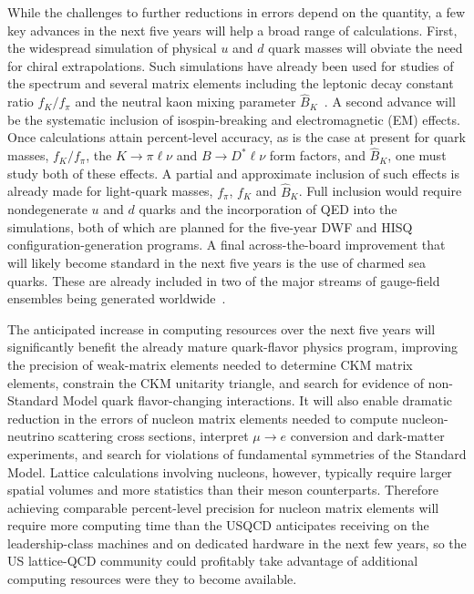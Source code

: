 While the challenges to further reductions in errors depend on the quantity, a
few key advances in the next five years will help a broad range of
calculations.  First, the widespread simulation of physical $u$ and $d$ quark
masses will obviate the need for chiral extrapolations.  Such simulations have
already been used for studies of the spectrum and several matrix elements
including the leptonic decay constant ratio $f_K/f_\pi$ and the neutral kaon
mixing parameter
$\hat{B}_K$~\cite{Aoki:2009ix,Durr:2010vn,Durr:2010aw,Bazavov:2013cp,Dowdall:2013rya}.
A second advance will be the systematic inclusion of isospin-breaking and
electromagnetic (EM) effects.  Once calculations attain percent-level
accuracy, as is the case at present for quark masses, $f_K/f_\pi$, the
$K\to\pi\ell\nu$ and $B\to D^*\ell\nu$ form factors, and $\hat B_K$, one must
study both of these effects.  A partial and approximate inclusion of such
effects is already made for light-quark masses, $f_\pi$, $f_K$ and $\hat B_K$.
Full inclusion would require nondegenerate $u$ and $d$ quarks and the
incorporation of QED into the simulations, both of which are planned for the
five-year DWF and HISQ configuration-generation programs.  A final
across-the-board improvement that will likely become standard in the next five
years is the use of charmed sea quarks.  These are already included in two of
the major streams of gauge-field ensembles being generated
worldwide~\cite{Baron:2009wt,Bazavov:2012xda}.

The anticipated increase in computing resources over the next five years will
significantly benefit the already mature quark-flavor physics program,
improving the precision of weak-matrix elements needed to determine CKM matrix
elements, constrain the CKM unitarity triangle, and search for evidence of
non-Standard Model quark flavor-changing interactions.  It will also enable
dramatic reduction in the errors of nucleon matrix elements needed to compute
nucleon-neutrino scattering cross sections, interpret $\mu \to e$ conversion
and dark-matter experiments, and search for violations of fundamental
symmetries of the Standard Model.  Lattice calculations involving nucleons,
however, typically require larger spatial volumes and more statistics than
their meson counterparts.  Therefore achieving comparable percent-level
precision for nucleon matrix elements will require more computing time than
the USQCD anticipates receiving on the leadership-class machines and on
dedicated hardware in the next few years, so the US lattice-QCD community
could profitably take advantage of additional computing resources were they to
become available.

